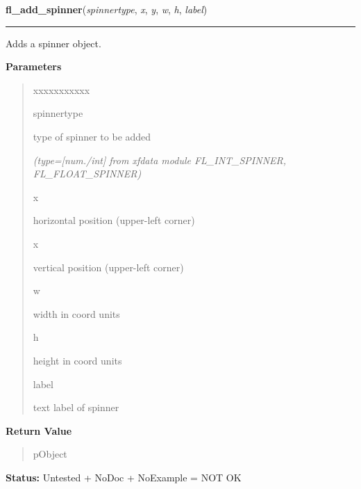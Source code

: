 \hspace{.8\funcindent}\begin{boxedminipage}{\funcwidth}

    \raggedright \textbf{fl\_add\_spinner}(\textit{spinnertype}, \textit{x}, \textit{y}, \textit{w}, \textit{h}, \textit{label})

    \vspace{-1.5ex}

    \rule{\textwidth}{0.5\fboxrule}
\setlength{\parskip}{2ex}
    Adds a spinner object.

\setlength{\parskip}{1ex}
      \textbf{Parameters}
      \vspace{-1ex}

      \begin{quote}
        \begin{Ventry}{xxxxxxxxxxx}

          \item[spinnertype]

          type of spinner to be added

            {\it (type=[num./int] from xfdata module FL\_INT\_SPINNER, FL\_FLOAT\_SPINNER)}

          \item[x]

          horizontal position (upper-left corner)

          \item[x]

          vertical position (upper-left corner)

          \item[w]

          width in coord units

          \item[h]

          height in coord units

          \item[label]

          text label of spinner

        \end{Ventry}

      \end{quote}

      \textbf{Return Value}
    \vspace{-1ex}

      \begin{quote}
      pObject

      \end{quote}

\textbf{Status:} Untested + NoDoc + NoExample = NOT OK



    \end{boxedminipage}


